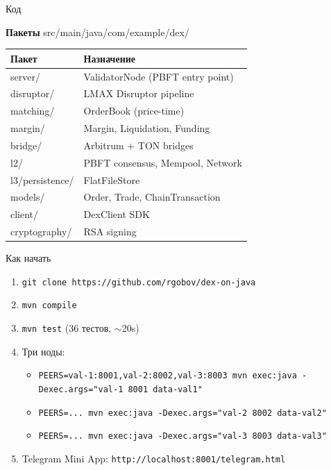 \documentclass[aspectratio=169]{beamer}
\begin{document}
\begin{frame}{Код}

\textbf{Пакеты} src/main/java/com/example/dex/

\centering
\begin{tabular}{ll}
\toprule
\textbf{Пакет} & \textbf{Назначение} \\
\midrule
server/ & ValidatorNode (PBFT entry point) \\
disruptor/ & LMAX Disruptor pipeline \\
matching/ & OrderBook (price-time) \\
margin/ & Margin, Liquidation, Funding \\
bridge/ & Arbitrum + TON bridges \\
l2/ & PBFT consensus, Mempool, Network \\
l3/persistence/ & FlatFileStore \\
models/ & Order, Trade, ChainTransaction \\
client/ & DexClient SDK \\
cryptography/ & RSA signing \\
\bottomrule
\end{tabular}

\vspace{0.5em}
\centering{\small \textcolor{gray}{Всего: 36 тестов, все проходят. \quad Java 25. \quad Maven single module.}}
\end{frame}

\begin{frame}{Как начать}

\begin{enumerate}
    \item \texttt{git clone https://github.com/rgobov/dex-on-java}
    \item \texttt{mvn compile}
    \item \texttt{mvn test} \quad (36 тестов, $\sim$20s)
    \item Три ноды:
    \begin{itemize}
        \item \texttt{PEERS=val-1:8001,val-2:8002,val-3:8003 mvn exec:java -Dexec.args="val-1 8001 data-val1"}
        \item \texttt{PEERS=... mvn exec:java -Dexec.args="val-2 8002 data-val2"}
        \item \texttt{PEERS=... mvn exec:java -Dexec.args="val-3 8003 data-val3"}
    \end{itemize}
    \item Telegram Mini App: \texttt{http://localhost:8001/telegram.html}
\end{enumerate}
\end{frame}
\end{document}
